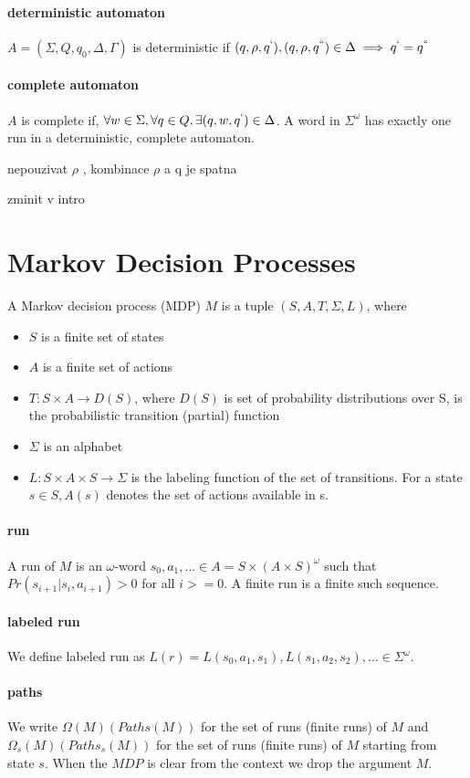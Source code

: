 \documentclass[
	digital
nolof, nolot
]{fithesis3}
\begin{document}
		\paragraph{deterministic automaton}
		$A=(\Sigma, Q, q_0, \Delta, \Gamma)$ is deterministic if \newline$(q, \rho, q^`), (q, \rho, q^{``})\in\Delta\implies q^`=q^{``}$
		\paragraph{complete automaton}
		$A$ is complete if, $\forall w \in \Sigma, \forall q \in Q, \exists (q, w, q^`)\in\Delta$. A word in $\Sigma^\omega$ has exactly one run in a deterministic, complete automaton. 
		
		nepouzivat $\rho$ , kombinace $\rho$ a q je spatna
		
		zminit v intro
		\section{Markov Decision Processes}
		A Markov decision process (MDP) $M$
		is a tuple $(S, A, T, \Sigma, L)$, where
		\begin{itemize}
			\item $S$ is a finite set of states
			\item $A$ is a finite set of actions
			\item $T:S\times A \rightarrow D(S)$, where $D(S)$ is set of probability distributions over S, is  the probabilistic transition (partial) function
			\item $\Sigma$ is an alphabet
			\item $L:S\times A \times S \rightarrow \Sigma$ is the labeling function of the set of transitions.
			For a state $s \in S, A(s)$ denotes the set of actions available in s.
		\end{itemize}
		\paragraph{run}
		A run of $M$ is an $\omega$-word 
		$s_0,a_1,...\in A=S \times (A \times S)^\omega$
		such that $Pr(s_{i+1}|s_i, a_{i+1})>0$ for all $i >= 0$. A finite run is a finite such sequence.
		\paragraph{labeled run}
		We define labeled run as
		$L(r)=L(s_0,a_1,s_1), L(s_1, a_2, s_2),... \in \Sigma^\omega$.
		\paragraph{paths}
		We write $\Omega(M)(Paths(M))$
		for the set of runs (finite runs) of $M$ and
		$\Omega_s(M)(Paths_s(M))$ for the set of runs (finite runs)
		of $M$ starting from state $s$. When the $MDP$ is clear from the context we drop the argument $M$.
\end{document}
